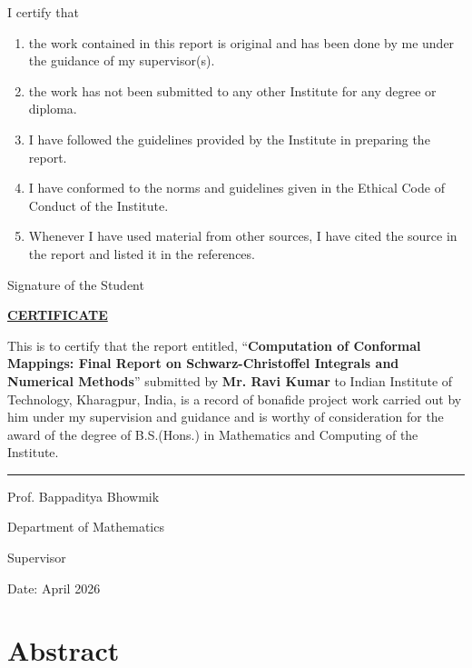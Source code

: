 \documentclass[12pt,a4paper]{article}
\begin{document}
I certify that
\vspace{1cm}

\begin{enumerate}[label=\alph*., leftmargin=2cm]
\item the work contained in this report is original and has been done by me under the guidance of my supervisor(s).
\item the work has not been submitted to any other Institute for any degree or diploma.
\item I have followed the guidelines provided by the Institute in preparing the report.
\item I have conformed to the norms and guidelines given in the Ethical Code of Conduct of the Institute.
\item Whenever I have used material from other sources, I have cited the source in the report and listed it in the references.
\end{enumerate}

\vspace{3cm}
\hfill Signature of the Student

\newpage

\begin{center}
\textbf{\underline{CERTIFICATE}}
\end{center}
\vspace{2cm}

This is to certify that the report entitled, ``\textbf{Computation of Conformal Mappings: Final Report on Schwarz-Christoffel Integrals and Numerical Methods}'' submitted by \textbf{Mr. Ravi Kumar} to Indian Institute of Technology, Kharagpur, India, is a record of bonafide project work carried out by him under my supervision and guidance and is worthy of consideration for the award of the degree of B.S.(Hons.) in Mathematics and Computing of the Institute.

\vspace{4cm}
\noindent\rule{5cm}{0.4pt}

\noindent Prof. Bappaditya Bhowmik

\noindent Department of Mathematics

\noindent Supervisor

\vspace{1cm}
\noindent Date: April 2026

\newpage


\section*{Abstract}
\end{document}
